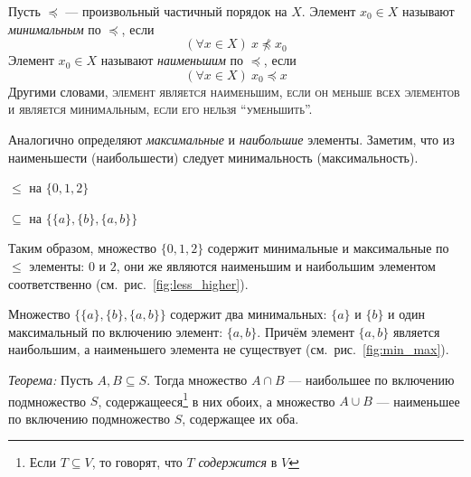 Пусть $\preceq$ --- произвольный частичный порядок на $X$.
Элемент $x_0\in X$ называют {\it минимальным}
по $\preceq$, если
\[
  (\forall x\in X)~x\npreceq x_0
\]
Элемент $x_0\in X$ называют {\it наименьшим}
 по $\preceq$, если
\[
  (\forall x\in X)~x_0\preceq x
\]
Другими словами, \textsc{элемент является наименьшим,
  если он меньше всех элементов и является минимальным, если его нельзя
  ``уменьшить''.}

Аналогично определяют {\it максимальные} и {\it наибольшие} элементы.
Заметим, что из наименьшести (наибольшести) следует минимальность (максимальность).

\begin{marginfigure}
  \center

  \caption{$\leq$ на $\{0,1,2\}$}\label{fig:less_higher}
\end{marginfigure}

\begin{marginfigure}
  \center

  \caption{$\subseteq$ на $\{\{a\},\{b\},\{a,b\}\}$}\label{fig:min_max}
\end{marginfigure}

Таким образом, множество $\{0,1,2\}$ содержит минимальные и максимальные по $\leq$
элементы: $0$ и $2$, они же являются наименьшим и
наибольшим элементом соответственно (см.~рис.~\ref{fig:less_higher}).

Множество $\{\{a\},\{b\},\{a,b\}\}$ содержит
два минимальных: $\{a\}$ и $\{b\}$ и один максимальный
по включению элемент: $\{a,b\}$. Причём элемент $\{a,b\}$ является наибольшим, а
наименьшего элемента не существует (см.~рис.~\ref{fig:min_max}).

\pagebreak
{\it Теорема:} Пусть $A,B\subseteq S$. Тогда множество $A\cap B$ ---
наибольшее по включению подмножество $S$, содержащееся\footnote{Если $T\subseteq V$,
  то говорят, что $T$ {\it содержится}
  в $V$} в них обоих,
а множество $A\cup B$ --- наименьшее по включению подмножество $S$,
содержащее их оба.

